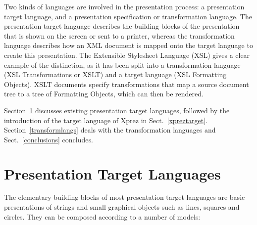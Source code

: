 Two kinds of languages are involved in the presentation process: a presentation target language, and a presentation specification or transformation language. The presentation target language describes the building blocks of the presentation that is shown on the screen or sent to a printer, whereas the transformation language describes how an XML document is mapped onto the target language to create this presentation. The Extensible Stylesheet Language (XSL) gives a clear example of the distinction, as it has been split into a transformation language (XSL Transformations or XSLT) and a target language (XSL Formatting Objects). XSLT documents specify transformations that map a source document tree to a tree of Formatting Objects, which can then be rendered. 

Section~\ref{targetlangs} discusses existing presentation target languages, followed by the introduction of the target language of {\sc Xprez} in Sect.~\ref{xpreztarget}. Section~\ref{transformlangs} deals with the transformation languages and Sect.~\ref{conclusions} concludes.


%									
%									
%									
\section{Presentation Target Languages}
\label{targetlangs}

The elementary building blocks of most presentation target languages are basic presentations of strings and small graphical objects such as lines, squares and circles. They can be composed according to a number of models:

